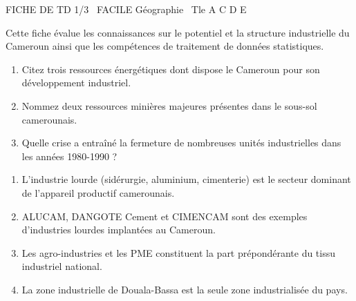 \documentclass[11pt]{article}
\begin{document}
\begin{tcolorbox}[enhanced,colback=popink,colframe=popink,arc=10pt,boxrule=0pt,left=12pt,right=12pt,top=9pt,bottom=9pt]
{\color{white}\popxbold\small FICHE DE TD 1/3 \textbullet\ FACILE \hfill Géographie \textbullet\ Tle A C D E\par}
\end{tcolorbox}
\vspace{4pt}
Cette fiche évalue les connaissances sur le potentiel et la structure industrielle du Cameroun ainsi que les compétences de traitement de données statistiques.

\begin{exercice}
\begin{enumerate}
    \item Citez trois ressources énergétiques dont dispose le Cameroun pour son développement industriel.
    \item Nommez deux ressources minières majeures présentes dans le sous-sol camerounais.
    \item Quelle crise a entraîné la fermeture de nombreuses unités industrielles dans les années 1980-1990 ?
\end{enumerate}
\end{exercice}

\begin{exercice}
\begin{enumerate}
    \item L'industrie lourde (sidérurgie, aluminium, cimenterie) est le secteur dominant de l'appareil productif camerounais.
    \item ALUCAM, DANGOTE Cement et CIMENCAM sont des exemples d'industries lourdes implantées au Cameroun.
    \item Les agro-industries et les PME constituent la part prépondérante du tissu industriel national.
    \item La zone industrielle de Douala-Bassa est la seule zone industrialisée du pays.
\end{enumerate}
\end{exercice}
\end{document}
